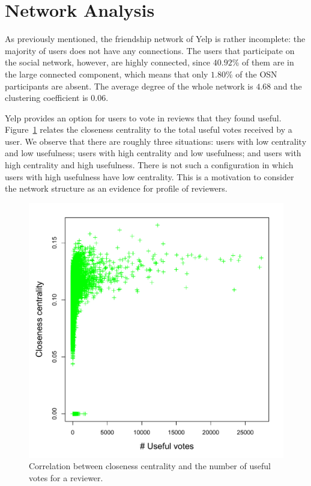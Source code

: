 \section{Network Analysis}
As previously mentioned, the friendship network of Yelp is rather incomplete: the majority of users does not have any connections. The users that participate on the social network, however, are highly connected, since $40.92$\% of them are in the large connected component, which means that only $1.80$\% of the OSN participants are absent. The average degree of the whole network is $4.68$ and the clustering coefficient is $0.06$.

Yelp provides an option for users to vote in reviews that they found useful. Figure~\ref{fig:clo_use} relates the closeness centrality to the total useful votes received by a user. We observe that there are roughly three situations: users with low centrality and low usefulness; users with high centrality and low usefulness; and users with high centrality and high usefulness. There is not such a configuration in which users with high usefulness have low centrality. This is a motivation to consider the network structure as an evidence for profile of reviewers.

\begin{figure}[H]
\centering
\includegraphics[scale=0.5]{img/close_useful_scatter}
\caption{Correlation between closeness centrality and the number of useful votes for a reviewer.}
\label{fig:clo_use}
\end{figure}

